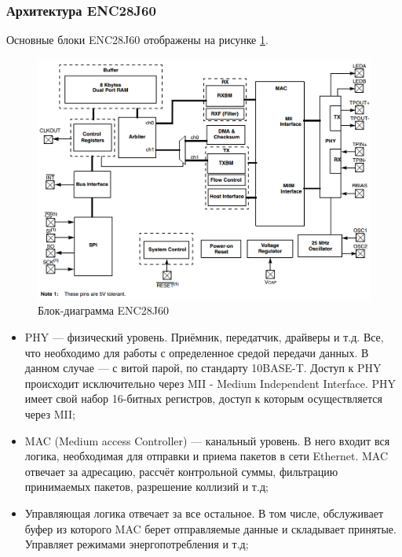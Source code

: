 \subsubsection{Архитектура ENC28J60}

Основные блоки ENC28J60 отображены на рисунке \ref{fig:encblocks}.

\begin{figure}[H]
	\centering
		\includegraphics[scale=0.5]{img/encblockdiagram.png}
	\caption{Блок-диаграмма ENC28J60\label{fig:encblocks} \cite{enc28j60datasheet}}
\end{figure}

\begin{itemize}
	\item PHY --- физический уровень. Приёмник, передатчик, драйверы и т.д. Все, что необходимо для работы с определенное средой передачи данных. В данном случае --- с витой парой, по стандарту 10BASE-T. Доступ к PHY происходит исключительно через MII - Medium Independent Interface. PHY имеет свой набор 16-битных регистров, доступ к которым осуществляется через MII;
	\item MAC (Medium access Controller) --- канальный уровень. В него входит вся логика, необходимая для отправки и приема пакетов в сети Ethernet. MAC отвечает за адресацию, рассчёт контрольной суммы, фильтрацию принимаемых пакетов, разрешение коллизий и т.д;
	\item Управляющая логика отвечает за все остальное. В том числе, обслуживает буфер из которого MAC берет отправляемые данные и складывает принятые. Управляет режимами энергопотребления и т.д;
\end{itemize}

